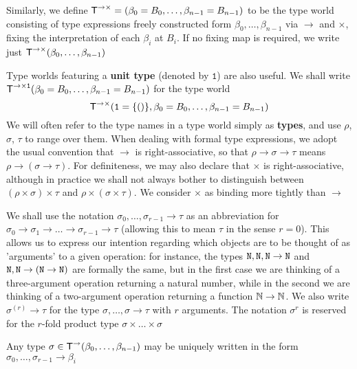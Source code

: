 \documentclass[11pt]{article}
\begin{document}
\begin{examplle}[]
Similarly, we define \(\textsf{T}^{\to\times}=(\beta_0=B_0,\dots,\beta_{n-1}=B_{n-1})\) to be the type world consisting
of type expressions freely constructed form \(\beta_0,\dots,\beta_{n-1}\) via \(\to\) and \(\times\), fixing the
interpretation of each \(\beta_i\) at \(B_i\). If no fixing map is required, we write
just \(\textsf{T}^{\to\times}(\beta_0,\dots,\beta_{n-1})\)

Type worlds featuring a \textbf{unit type} (denoted by \(\texttt{1}\)) are also useful. We shall
write \(\textsf{T}^{\to\times\texttt{1}}(\beta_0=B_0,\dots,\beta_{n-1}=B_{n-1})\) for the type world
\begin{equation*}
\textsf{T}^{\to\times}(\texttt{1}=\{()\},\beta_0=B_0,\dots,\beta_{n-1}=B_{n-1})
\end{equation*}
We will often refer to the type names in a type world simply as \textbf{types}, and use \(\rho\), \(\sigma\), \(\tau\) to range
over them. When dealing with formal type expressions, we adopt the usual convention that \(\to\)
is right-associative, so that \(\rho\to\sigma\to\tau\) means \(\rho\to(\sigma\to\tau)\). For definiteness, we may also declare
that \(\times\) is right-associative, although in practice we shall not always bother to distinguish
between \((\rho\times\sigma)\times\tau\) and \(\rho\times(\sigma\times\tau)\). We consider \(\times\) as binding more tightly than \(\to\)

We shall use the notation \(\sigma_0,\dots,\sigma_{r-1}\to\tau\) as an abbreviation for \(\sigma_0\to\sigma_1\to\dots\to\sigma_{r-1}\to\tau\)
(allowing this to mean \(\tau\) in the sense \(r=0\)). This allows us to express our intention
regarding which objects are to be thought of as 'arguments' to a given operation: for instance,
the types \(\texttt{N},\texttt{N},\texttt{N}\to\texttt{N}\) and \(\texttt{N},\texttt{N}\to(\texttt{N}\to\texttt{N})\) are formally the same, but in
the first case we are thinking of a three-argument operation returning a natural number, while
in the second we are thinking of a two-argument operation returning a function \(\mathbb{N}\to\mathbb{N}\). We also
write \(\sigma^{(r)}\to\tau\) for the type \(\sigma,\dots,\sigma\to\tau\) with \(r\) arguments. The notation \(\sigma^r\) is
reserved for the \(r\)-fold product type \(\sigma\times\dots\times\sigma\)
\end{examplle}

\begin{proposition}[]
Any type \(\sigma\in\textsf{T}^{\to}(\beta_0,\dots,\beta_{n-1})\) may be uniquely written in the form \(\sigma_0,\dots,\sigma_{r-1}\to\beta_i\)
\end{proposition}
\end{document}
